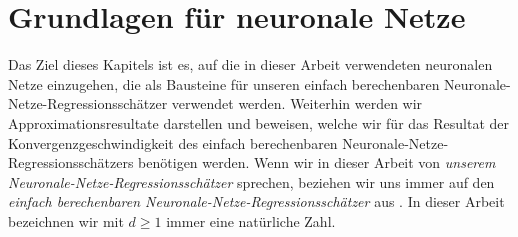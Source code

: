 \chapter{Grundlagen für neuronale Netze}
\label{chap:1}

Das Ziel dieses Kapitels ist es, auf die in dieser Arbeit verwendeten neuronalen Netze einzugehen, die als Bausteine für unseren einfach berechenbaren Neuronale-Netze-Regressionsschätzer verwendet werden. Weiterhin werden wir Approximationsresultate darstellen und beweisen, welche wir für das Resultat der Konvergenzgeschwindigkeit des einfach berechenbaren Neuronale-Netze-Regressionsschätzers benötigen werden. Wenn wir in dieser Arbeit von \emph{unserem Neuronale-Netze-Regressionsschätzer} sprechen, beziehen wir uns immer auf den \emph{einfach berechenbaren Neuronale-Netze-Regressionsschätzer} aus \cite{kohler19}. 
In dieser Arbeit bezeichnen wir mit $d \geq 1$ immer eine natürliche Zahl.

